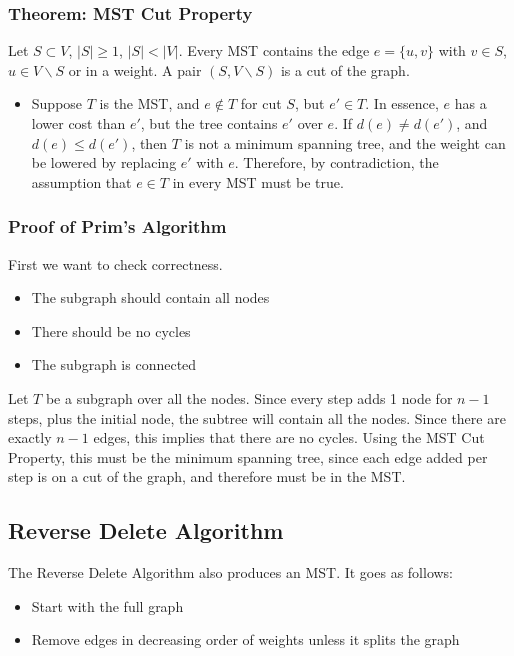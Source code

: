 \documentclass[10pt]{article}
\begin{document}
\subsubsection*{Theorem: MST Cut Property}
Let $S \subset V$, $|S| \geq 1$, $|S| < |V|$.  Every MST contains the edge $e = \{u, v\}$ with $v \in S$, $u \in V \backslash S$ or in a weight.  A pair $(S, V \backslash S)$ is a cut of the graph.
\begin{itemize}
	\item Suppose $T$ is the MST, and $e \notin T$ for cut $S$, but $e' \in T$.  In essence, $e$ has a lower cost than $e'$, but the tree contains $e'$ over $e$.  If $d(e) \neq d(e')$, and $d(e) \leq d(e')$, then $T$ is not a minimum spanning tree, and the weight can be lowered by replacing $e'$ with $e$.  Therefore, by contradiction, the assumption that $e \in T$ in every MST must be true.
\end{itemize}

\subsubsection*{Proof of Prim's Algorithm}
First we want to check correctness.
\begin{itemize}
	\item The subgraph should contain all nodes
	\item There should be no cycles
	\item The subgraph is connected
\end{itemize}
Let $T$ be a subgraph over all the nodes.  Since every step adds 1 node for $n - 1$ steps, plus the initial node, the subtree will contain all the nodes.  Since there are exactly $n - 1$ edges, this implies that there are no cycles.  Using the MST Cut Property, this must be the minimum spanning tree, since each edge added per step is on a cut of the graph, and therefore must be in the MST.

\subsection*{Reverse Delete Algorithm}
The Reverse Delete Algorithm also produces an MST.  It goes as follows:
\begin{itemize}
    \item Start with the full graph
    \item Remove edges in decreasing order of weights unless it splits the graph
\end{itemize}
\end{document}
